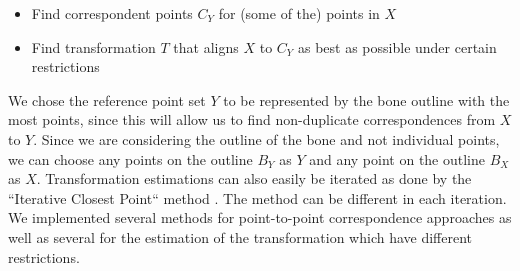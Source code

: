 \documentclass[pdftex,12pt,a4paper]{report}
\begin{document}
\begin{itemize}
\item Find correspondent points $C_Y$ for (some of the) points in $X$
\item Find transformation $T$ that aligns $X$ to $C_Y$ as best as possible under certain restrictions
\end{itemize}

We chose the reference point set $Y$ to be represented by the bone outline with the most points, since this will allow
us to find non-duplicate correspondences from $X$ to $Y$. Since we are considering the outline of the bone and not
individual points, we can choose any points on the outline $B_Y$ as $Y$ and any point on the outline $B_X$ as $X$.
Transformation estimations can also easily be iterated as done by the ``Iterative Closest Point`` method \cite{besl1992method}.
The method can be different in each iteration. We implemented several methods for point-to-point correspondence
approaches as well as several for the estimation of the transformation which have different restrictions.
\end{document}
